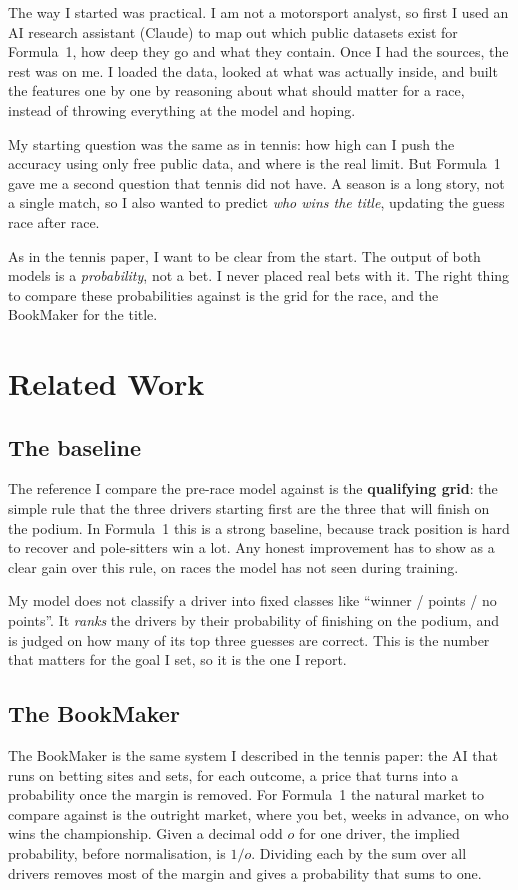 \documentclass[10pt,twocolumn]{article}
\begin{document}
The way I started was practical. I am not a motorsport analyst, so first I used
an AI research assistant (Claude) to map out which public datasets exist for
Formula~1, how deep they go and what they contain. Once I had the sources, the
rest was on me. I loaded the data, looked at what was actually inside, and built
the features one by one by reasoning about what should matter for a race,
instead of throwing everything at the model and hoping.

My starting question was the same as in tennis: how high can I push the
accuracy using only free public data, and where is the real limit. But Formula~1
gave me a second question that tennis did not have. A season is a long story,
not a single match, so I also wanted to predict \emph{who wins the title},
updating the guess race after race.

As in the tennis paper, I want to be clear from the start. The output of both
models is a \emph{probability}, not a bet. I never placed real bets with it.
The right thing to compare these probabilities against is the grid for the
race, and the BookMaker for the title.

\section{Related Work}

\subsection{The baseline}
The reference I compare the pre-race model against is the \textbf{qualifying
grid}: the simple rule that the three drivers starting first are the three that
will finish on the podium. In Formula~1 this is a strong baseline, because track
position is hard to recover and pole-sitters win a lot. Any honest improvement
has to show as a clear gain over this rule, on races the model has not seen
during training.

My model does not classify a driver into fixed classes like ``winner / points /
no points''. It \emph{ranks} the drivers by their probability of finishing on
the podium, and is judged on how many of its top three guesses are correct. This
is the number that matters for the goal I set, so it is the one I report.

\subsection{The BookMaker}
The BookMaker is the same system I described in the tennis paper: the AI that
runs on betting sites and sets, for each outcome, a price that turns into a
probability once the margin is removed. For Formula~1 the natural market to
compare against is the outright market, where you bet, weeks in advance, on who
wins the championship. Given a decimal odd \(o\) for one driver, the implied
probability, before normalisation, is \(1/o\). Dividing each by the sum over all
drivers removes most of the margin and gives a probability that sums to one.
\end{document}
